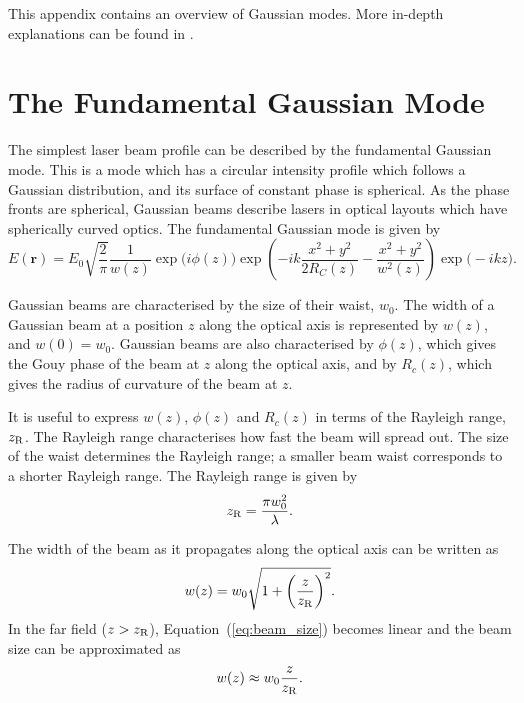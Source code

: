 This appendix contains an overview of Gaussian modes. More in-depth explanations can be found in \cite{lasers1986}.
\section{The Fundamental Gaussian Mode}
The simplest laser beam profile can be described by the fundamental Gaussian mode. This is a mode which has a circular intensity profile which follows a Gaussian distribution, and its surface of constant phase is spherical. As the phase fronts are spherical, Gaussian beams describe lasers in optical layouts which have spherically curved optics. The fundamental Gaussian mode is given by
\begin{equation}
E(\mathbf{r}) = E_0\sqrt{\frac{2}{\pi}} \frac{1}{w(z)} \exp\big(i\phi(z)\big)\exp\left( -ik\frac{x^2 + y^2}{2R_C(z)} - \frac{x^2 + y^2}{w^2(z)}\right)\exp\big(-ikz\big).
\label{eq:gaussian_mode}
\end{equation}
\par
Gaussian beams are characterised by the size of their waist, $w_0$. The width of a Gaussian beam at a position $z$ along the optical axis is represented by $w(z)$, and $w(0) = w_0$. Gaussian beams are also characterised by $\phi(z)$, which gives the Gouy phase of the beam at $z$ along the optical axis, and by $R_c(z)$, which gives the radius of curvature of the beam at $z$.
\par
It is useful to express $w(z)$, $\phi(z)$ and $R_c(z)$ in terms of the Rayleigh range, $z_{\rm{R}}$. The Rayleigh range characterises how fast the beam will spread out. The size of the waist determines the Rayleigh range; a smaller beam waist corresponds to a shorter Rayleigh range. The Rayleigh range is given by
\begin{equation}
z_{\rm{R}} = \frac{\pi w_0^2}{\lambda}.
\end{equation} 
\par
The width of the beam as it propagates along the optical axis can be written as
\begin{equation}
	w(z) = w_0\sqrt{1 + \left(\frac{z}{z_{\rm{R}}}\right)^2}.
	\label{eq:beam_size}
\end{equation} 
In the far field ($z>z_{\rm{R}}$), Equation~(\ref{eq:beam_size}) becomes linear and the beam size can be approximated as 
\begin{equation}
w(z) \approx w_0\frac{z}{z_{\rm{R}}}.
\end{equation}
\par
